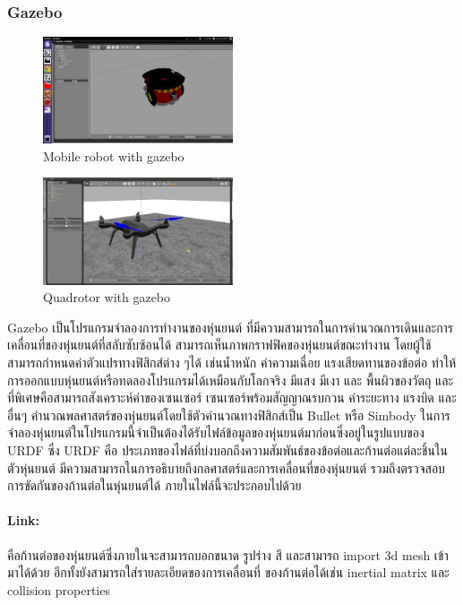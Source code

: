 \subsubsection*{Gazebo}
\begin{figure}[htbp]
    \centering
    \includegraphics[width=0.5\textwidth]{chapter2/images/sim_gazebo1.png}
    \caption{Mobile robot with gazebo}
    \label{fig:sim_gazebo1}
\end{figure}
\begin{figure}[htbp]
    \centering
    \includegraphics[width=0.5\textwidth]{chapter2/images/sim_gazebo2.jpg}
    \caption{Quadrotor with gazebo}
    \label{fig:sim_gazebo2}
\end{figure}
Gazebo เป็นโปรแกรมจำลองการทำงานของหุ่นยนต์ ที่มีความสามารถในการคำนวณการเดินและการเคลื่อนที่ของหุ่นยนต์ที่สลับซับซ้อนได้ สามารถเห็นภาพกราฟฟิคของหุ่นยนต์ขณะทำงาน โดยผู้ใช้สามารถกำหนดค่าตัวแปรทางฟิสิกส์ต่าง ๆได้ เช่นน้ำหนัก ค่าความเฉื่อย แรงเสียดทานของข้อต่อ ทำให้การออกแบบหุ่นยนต์หรือทดลองโปรแกรมได้เหมือนกับโลกจริง มีแสง มีเงา และ พื้นผิวของวัตถุ และที่พิเศษคือสามารถสังเคราะห์ค่าของเซนเซอร์ เซนเซอร์พร้อมสัญญาณรบกวน ค่าระยะทาง แรงบิด และอื่นๆ คำนวณพลศาสตร์ของหุ่นยนต์โดยใช้ตัวคำนวณทางฟิสิกส์เป็น Bullet หรือ Simbody ในการจำลองหุ่นยนต์ในโปรแกรมนี้จำเป็นต้องได้รับไฟล์ข้อมูลของหุ่นยนต์มาก่อนซึ่งอยู่ในรูปแบบของ URDF ซึ่ง URDF คือ ประเภทของไฟล์ที่บ่งบอกถึงความสัมพันธ์ของข้อต่อและก้านต่อแต่ละชิ้นในตัวหุ่นยนต์ มีความสามารถในการอธิบายถึงกลศาสตร์และการเคลื่อนที่ของหุ่นยนต์ รวมถึงตรวจสอบการขัดกันของก้านต่อในหุ่นยนต์ได้ ภายในไฟล์นี้จะประกอบไปด้วย

\paragraph*{Link:}
คือก้านต่อของหุ่นยนต์ซึ่งภายในจะสามารถบอกขนาด รูปร่าง สี และสามารถ import 3d mesh เข้ามาได้ด้วย อีกทั้งยังสามารถใส่รายละเอียดของการเคลื่อนที่ ของก้านต่อได้เช่น inertial matrix และ collision properties

